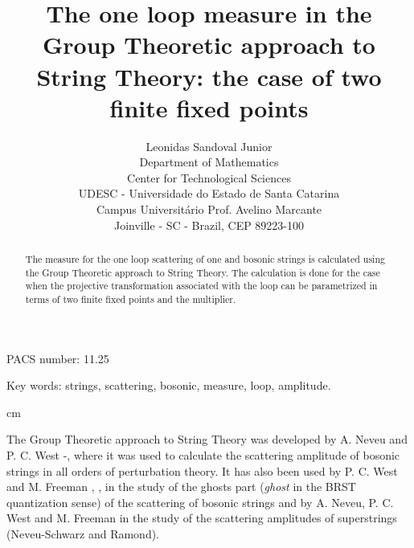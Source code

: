 \documentclass[a4paper,12pt]{article}
\begin{document}
\title{The one loop measure in the Group Theoretic approach to String Theory: the case of two finite fixed points}

\author{Leonidas Sandoval Junior\\ Department of Mathematics\\ Center for Technological
Sciences\\ UDESC - Universidade do Estado de Santa Catarina\\ Campus Universit\'ario Prof.
Avelino Marcante\\ Joinville - SC - Brazil, CEP 89223-100}

\maketitle

\begin{abstract}
The measure for the one loop scattering of one and \coordHE{} bosonic strings is calculated using the Group Theoretic approach to String Theory. The calculation is done for the case when the
projective transformation associated with the loop can be parametrized in terms of two finite fixed points and the multiplier.
\end{abstract}

\noindent PACS number: 11.25

\noindent Key words: strings, scattering, bosonic, measure, loop, amplitude.

 cm

The Group Theoretic approach to String Theory was developed by A. Neveu and P. C. West
\cite{1}-\cite{5}, where it was used to calculate the scattering amplitude of bosonic strings in all orders of perturbation theory. It has also been used by P. C. West and M. Freeman \cite{6}, \cite{7}, in the study of the ghosts part ({\sl ghost} in the BRST quantization sense) of the scattering of bosonic strings and by A. Neveu, P. C. West and M. Freeman \cite{8} in the study of the scattering amplitudes of superstrings (Neveu-Schwarz and Ramond).
\end{document}
